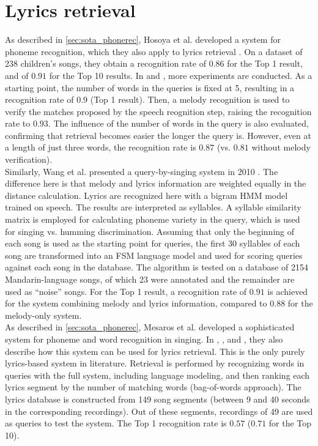 \section{Lyrics retrieval}
As described in \ref{sec:sota_phonerec}, Hosoya et al. developed a system for phoneme recognition, which they also apply to lyrics retrieval \cite{Hosoya2005}. On a dataset of 238 children's songs, they obtain a recognition rate of $0.86$ for the Top 1 result, and of $0.91$ for the Top 10 results. In \cite{suzuki06} and \cite{suzuki07}, more experiments are conducted. As a starting point, the number of words in the queries is fixed at 5, resulting in a recognition rate of $0.9$ (Top 1 result). Then, a melody recognition is used to verify the matches proposed by the speech reognition step, raising the recognition rate to $0.93$. The influence of the number of words in the query is also evaluated, confirming that retrieval becomes easier the longer the query is. However, even at a length of just three words, the recognition rate is $0.87$ (vs. $0.81$ without melody verification).\\

Similarly, Wang et al. presented a query-by-singing system in 2010 \cite{Wang2010}. The difference here is that melody and lyrics information are weighted equally in the distance calculation. Lyrics are recognized here with a bigram HMM model trained on speech. The results are interpreted as syllables. A syllable similarity matrix is employed for calculating phoneme variety in the query, which is used for singing vs. humming discrimination. Assuming that only the beginning of each song is used as the starting point for queries, the first 30 syllables of each song are transformed into an FSM language model and used for scoring queries against each song in the database. The algorithm is tested on a database of 2154 Mandarin-language songs, of which 23 were annotated and the remainder are used as ``noise'' songs. For the Top 1 result, a recognition rate of $0.91$ is achieved for the system combining melody and lyrics information, compared to $0.88$ for the melody-only system.\\

As described in \ref{sec:sota_phonerec}, Mesaros et al. developed a sophisticated system for phoneme and word recognition in singing. In \cite{mesaros1}, \cite{mesaros2}, and \cite{Mesaros2011}, they also describe how this system can be used for lyrics retrieval. This is the only purely lyrics-based system in literature. Retrieval is performed by recognizing words in queries with the full system, including language modeling, and then ranking each lyrics segment by the number of matching words (bag-of-words approach). The lyrics database is constructed from 149 song segments (between 9 and 40 seconds in the corresponding recordings). Out of these segments, recordings of 49 are used as queries to test the system. The Top 1 recognition rate is $0.57$ ($0.71$ for the Top 10).


